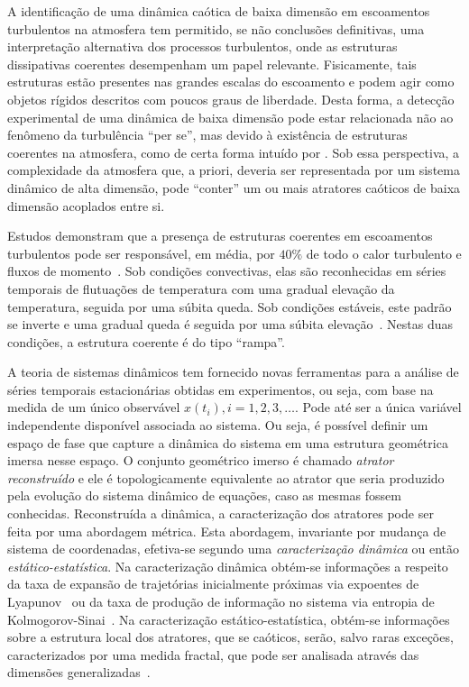 A identificação de uma dinâmica caótica de baixa dimensão em escoamentos turbulentos na atmosfera tem permitido, se não conclusões definitivas, uma interpretação alternativa dos processos turbulentos, onde as estruturas dissipativas coerentes desempenham um papel relevante. Fisicamente, tais estruturas estão presentes nas grandes escalas do escoamento e podem agir como objetos rígidos descritos com poucos graus de liberdade. Desta forma, a detecção experimental de uma dinâmica de baixa dimensão pode estar relacionada não ao fenômeno da turbulência ``per se'', mas devido à existência de estruturas coerentes na atmosfera, como de certa forma intuído por . Sob essa perspectiva, a complexidade da atmosfera que, a priori, deveria ser representada por um sistema dinâmico de alta dimensão, pode ``conter'' um ou mais atratores caóticos de baixa dimensão acoplados entre si.


Estudos demonstram que a presença de estruturas coerentes em escoamentos turbulentos pode ser responsável, em média, por $40\%$ de todo o calor turbulento e fluxos de momento~\cite{lu/94}. Sob condições convectivas, elas são reconhecidas em séries temporais de flutuações de temperatura com uma gradual elevação da temperatura, seguida por uma súbita queda. Sob condições estáveis, este padrão se inverte e uma gradual queda é seguida por uma súbita elevação~\cite{oliver/02}. Nestas duas condições, a estrutura coerente é do tipo ``rampa''. 

A teoria de sistemas dinâmicos tem fornecido novas ferramentas para a análise de séries temporais estacionárias obtidas em experimentos, ou seja, com base na medida de um único observável $x(t_{i}),i=1,2,3,\ldots$. Pode até ser a única variável independente disponível associada ao sistema. Ou seja, é possível definir um espaço de fase que capture a dinâmica do sistema em uma estrutura geométrica imersa nesse espaço. O conjunto geométrico imerso é chamado \textit{atrator reconstruído} e ele é topologicamente equivalente ao atrator que seria produzido pela evolução do sistema dinâmico de equações, caso as mesmas fossem conhecidas. Reconstruída a dinâmica, a caracterização dos atratores pode ser feita por uma abordagem métrica. Esta abordagem, invariante por mudança de sistema de coordenadas, efetiva-se segundo uma \textit{caracterização dinâmica} ou então \textit{estático-estatística}. Na caracterização dinâmica obtém-se informações a respeito da taxa de expansão de trajetórias inicialmente próximas via expoentes de Lyapunov~\cite{eckrue/86,sanosawada/85} ou da taxa de produção de informação no sistema via entropia de Kolmogorov-Sinai~\cite{ruelleentrop/89}. Na caracterização estático-estatística, obtém-se informações sobre a estrutura local dos atratores, que se caóticos, serão, salvo raras exceções, caracterizados por uma medida fractal, que pode ser analisada através das dimensões generalizadas~\cite{grassproca/83}.

